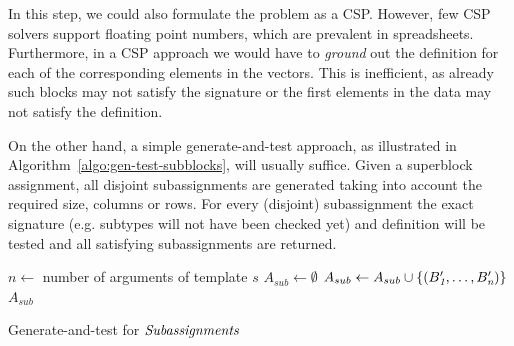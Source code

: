 In this step, we could also formulate the problem as a CSP. %
However, few CSP solvers support floating point numbers, which are prevalent in spreadsheets.
Furthermore, in a CSP approach we would have to \textit{ground} out the definition for each of the corresponding elements in the vectors.
This is inefficient, as already such blocks may not satisfy the signature or the first elements in the data may not satisfy the definition.

On the other hand, a simple generate-and-test approach, as illustrated in Algorithm~\ref{algo:gen-test-subblocks}, will usually suffice.
Given a superblock assignment, all disjoint subassignments are generated taking into account the required size, columns or rows.
For every (disjoint) subassignment the exact signature (e.g. subtypes will not have been checked yet) and definition will be tested and all satisfying subassignments are returned.

\begin{algorithm}[tbh]
  \begin{algorithmic}
    \footnotesize
    \State $n \gets$ number of arguments of template $s$
    \State $A_{sub} \gets \emptyset$
        \State $A_{sub} \gets A_{sub} \cup \{ (B_{\textit{1}}', \dots, B_{\textit{n}}') \}$
      \EndIf
    \EndFor
\Return $A_{sub}$
\EndProcedure
\end{algorithmic}
\caption{Generate-and-test for $\textit{Subassignments}$}
\label{algo:gen-test-subblocks}
\end{algorithm}






